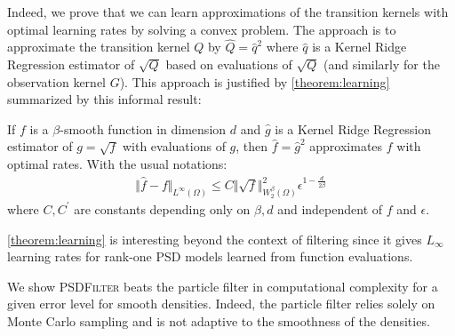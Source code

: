 Indeed, we prove that we can learn approximations of the transition kernels with optimal learning rates by solving a convex problem. The approach is to approximate the transition kernel $Q$ by $\hat Q = \hat q^2$ where $\hat q$ is a Kernel Ridge Regression estimator of $\sqrt{Q}$ based on evaluations of $\sqrt{Q}$ (and similarly for the observation kernel $G$). This approach is justified by \cref{theorem:learning} summarized by this informal result:
\begin{mdframed}
\begin{informaltheorem}
If $f$ is a $\beta$-smooth function in dimension $d$ and $\hat g$ is a Kernel Ridge Regression estimator of $g = \sqrt{f}$ with evaluations of $g$, then $\hat f = \hat g^2$ approximates $f$ with optimal rates. With the usual notations:
\begin{align}
    \Vert \hat f - f \Vert_{L^\infty(\Omega)}\leq C \Vert \sqrt{f}\Vert_{W^\beta_2(\Omega)}^2\epsilon^{1-\frac{d}{2\beta}}
\end{align}
where $C, C^\prime$ are constants depending only on $\beta, d$ and independent of $f$ and $\epsilon$.
\end{informaltheorem}
\end{mdframed}
\noindent \cref{theorem:learning} is interesting beyond the context of filtering since it gives $L_\infty$ learning rates for rank-one PSD models learned from function evaluations.

We show \textsc{PSDFilter} beats the particle filter in computational complexity for a given error level for smooth densities. Indeed, the particle filter relies solely on Monte Carlo sampling and is not adaptive to the smoothness of the densities.
